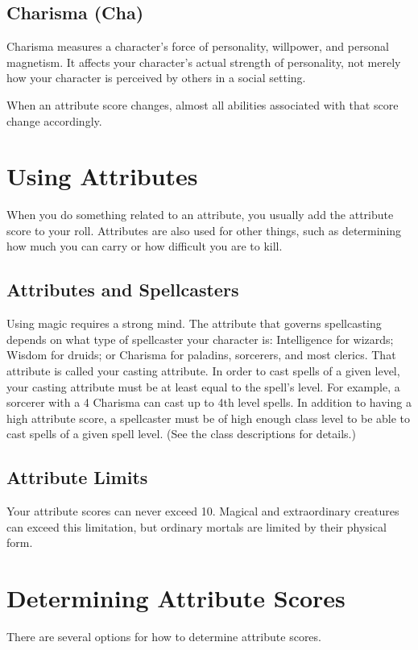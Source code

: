 \subsection{Charisma (Cha)}
Charisma measures a character's force of personality, willpower, and personal magnetism. It affects your character's actual strength of personality, not merely how your character is perceived by others in a social setting.

When an attribute score changes, almost all abilities associated with that score change accordingly.

\section{Using Attributes}
When you do something related to an attribute, you usually add the attribute score to your roll. Attributes are also used for other things, such as determining how much you can carry or how difficult you are to kill. 

\subsection{Attributes and Spellcasters}
Using magic requires a strong mind. The attribute that governs spellcasting depends on what type of spellcaster your character is: Intelligence for wizards; Wisdom for druids; or Charisma for paladins, sorcerers, and most clerics. That attribute is called your casting attribute. In order to cast spells of a given level, your casting attribute must be at least equal to the spell's level. For example, a sorcerer with a 4 Charisma can cast up to 4th level spells. In addition to having a high attribute score, a spellcaster must be of high enough class level to be able to cast spells of a given spell level. (See the class descriptions for details.)

\subsection{Attribute Limits}
Your attribute scores can never exceed 10. Magical and extraordinary creatures can exceed this limitation, but ordinary mortals are limited by their physical form.

\section{Determining Attribute Scores}
There are several options for how to determine attribute scores.


